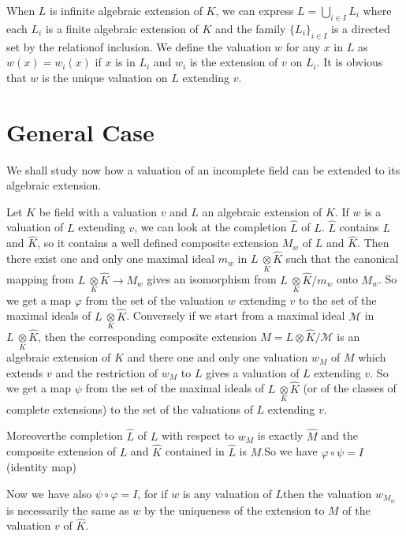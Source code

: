 When $L$ is infinite algebraic extension of $K$, we can express
$L=\bigcup\limits_{i \in I}L_i$ where each $L_i$ is a finite algebraic
extension of $K$ and the family $\{L_i\}_{i \in I}$ is a directed set
by the relation\pageoriginale of inclusion. We define the valuation $w$ for any $x$
in $L$ as $w(x)=w_i(x)$ if $x$ is in $L_i$ and $w_i$ is the extension
of $v$ on $L_i$. It is obvious that $w$ is the unique valuation on $L$
extending $v$.

\section{General Case}\label{part1:chap2:sec6}%

We shall study now how a valuation of an incomplete field can be
extended to its algebraic extension. 

Let $K$ be field with a valuation $v$ and $L$ an algebraic extension
of $K$. If $w$ is a valuation of $L$ extending $v$, we can look at the
completion $\hat{L}$ of $L$. $\hat{L}$ contains $L$ and
$\hat{K}$, so it contains a well defined composite extension $M_w$
of $L$ and $\hat{K}$. Then there exist one and only one maximal
ideal $m_w$ in $L~ \underset{K}\otimes \hat{K}$ such that the
canonical mapping from $L~ \underset{K}\otimes \hat{K} \to M_w$
gives an isomorphism from $L~ \underset{K}\otimes \hat{K}/m_w$
onto $M_w$. So we get a map $\varphi$ from the set of the valuation
$w$  extending $v$ to the set of the maximal ideals of $L~
\underset{K}\otimes \hat{K}$. Conversely if we start from a
maximal ideal $\mathcal{M}$ in $L~ \underset{K}\otimes \hat{K}$,
then the corresponding composite extension $M=L \otimes \hat{K}/
\mathcal{M}$ is an algebraic extension of $K$ and there one and only
one valuation $w_M$ of $M$ which extends $v$ and the restriction of
$w_M$ to $L$ gives a valuation of $L$ extending $v$. So we get a map
$\psi$ from the set of the maximal ideals of $L~ \underset{K}\otimes
\hat{K}$ (or of the classes of complete extensions) to the set of
the valuations of $L$ extending $v$. 
 
Moreover\pageoriginale the completion $\hat{L}$ of $L$ with respect to $w_M$ is
exactly $\hat{M}$ and the composite extension of $L$ and $\hat{K}$
contained in $\hat{L}$ is $M$.So we have $\varphi \circ \psi =I$ (identity map) 

Now we have also $\psi \circ \varphi = I$, for if $w$ is any valuation of
$L$then the valuation $w_{M_w}$ is necessarily the same as $w$ by the
uniqueness of the extension to $M$ of the valuation $v$ of $\hat{K}$.  

